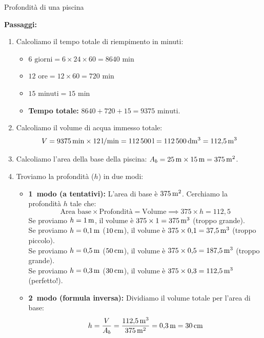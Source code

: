 \begin{esercizio}{Profondità di una piscina}
\begin{soluzione}
  \textbf{Passaggi:}
  \begin{enumerate}
    \item Calcoliamo il tempo totale di riempimento in minuti:
    \begin{itemize}
      \item $6\text{ giorni} = 6 \times 24 \times 60 = 8640\text{ min}$
      \item $12\text{ ore} = 12 \times 60 = 720\text{ min}$
      \item $15\text{ minuti} = 15\text{ min}$
      \item \textbf{Tempo totale:} $8640 + 720 + 15 = 9375\text{ minuti}$.
    \end{itemize}
    \item Calcoliamo il volume di acqua immesso totale:
    \[
    V = 9375\,\mathrm{min} \times 12\,\mathrm{l/min} = 112\,500\,\mathrm{l} = 112\,500\,\mathrm{dm^3} = 112{,}5\,\mathrm{m^3}
    \]
    \item Calcoliamo l'area della base della piscina: $A_b = 25\,\mathrm{m} \times 15\,\mathrm{m} = 375\,\mathrm{m^2}$.
    \item Troviamo la profondità ($h$) in due modi:
    \begin{itemize}
      \item \textbf{1\textdegree\ modo (a tentativi):} L'area di base è $375\,\mathrm{m^2}$. Cerchiamo la profondità $h$ tale che:
      \[
      \text{Area base} \times \text{Profondità} = \text{Volume} \implies 375 \times h = 112{,}5
      \]
      Se proviamo $h = 1\,\mathrm{m}$, il volume è $375 \times 1 = 375\,\mathrm{m^3}$ (troppo grande).\\
      Se proviamo $h = 0{,}1\,\mathrm{m}$ ($10\,\mathrm{cm}$), il volume è $375 \times 0{,}1 = 37{,}5\,\mathrm{m^3}$ (troppo piccolo).\\
      Se proviamo $h = 0{,}5\,\mathrm{m}$ ($50\,\mathrm{cm}$), il volume è $375 \times 0{,}5 = 187{,}5\,\mathrm{m^3}$ (troppo grande).\\
      Se proviamo $h = 0{,}3\,\mathrm{m}$ ($30\,\mathrm{cm}$), il volume è $375 \times 0{,}3 = 112{,}5\,\mathrm{m^3}$ (perfetto!).
      \item \textbf{2\textdegree\ modo (formula inversa):} Dividiamo il volume totale per l'area di base:
      \[
      h = \frac{V}{A_b} = \frac{112{,}5\,\mathrm{m^3}}{375\,\mathrm{m^2}} = 0{,}3\,\mathrm{m} = 30\,\mathrm{cm}
      \]
    \end{itemize}
  \end{enumerate}
\end{soluzione}
\end{esercizio}
